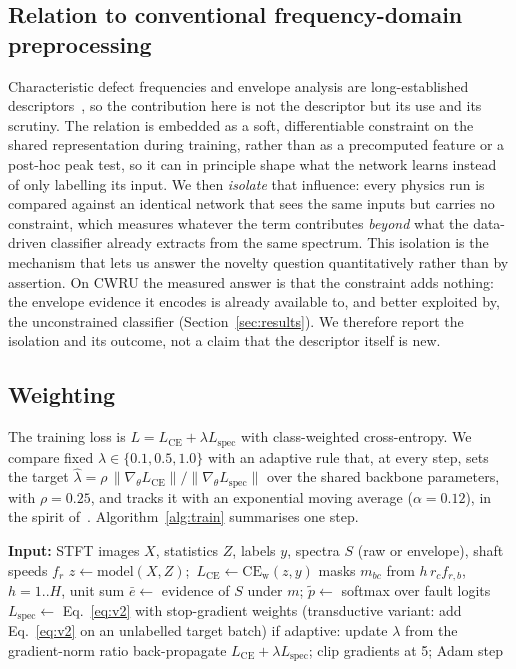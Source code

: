 \documentclass[conference]{IEEEtran}
\newcommand{\Lspec}{L_{\mathrm{spec}}}
\begin{document}
\subsection{Relation to conventional frequency-domain preprocessing}
\label{sec:novelty}
Characteristic defect frequencies and envelope analysis are long-established
descriptors~\cite{mcfadden1984,randall2011}, so the contribution here is not the
descriptor but its use and its scrutiny. The relation is embedded as a soft,
differentiable constraint on the shared representation during training, rather
than as a precomputed feature or a post-hoc peak test, so it can in principle
shape what the network learns instead of only labelling its input. We then
\emph{isolate} that influence: every physics run is compared against an
identical network that sees the same inputs but carries no constraint, which
measures whatever the term contributes \emph{beyond} what the data-driven
classifier already extracts from the same spectrum. This isolation is the
mechanism that lets us answer the novelty question quantitatively rather than by
assertion. On CWRU the measured answer is that the constraint adds nothing: the
envelope evidence it encodes is already available to, and better exploited by,
the unconstrained classifier (Section~\ref{sec:results}). We therefore report
the isolation and its outcome, not a claim that the descriptor itself is new.

\subsection{Weighting}
The training loss is $L=L_{\mathrm{CE}}+\lambda\Lspec$ with class-weighted
cross-entropy. We compare fixed $\lambda\in\{0.1,0.5,1.0\}$ with an adaptive
rule that, at every step, sets the target
$\hat\lambda=\rho\,\lVert\nabla_\theta L_{\mathrm{CE}}\rVert/\lVert\nabla_\theta\Lspec\rVert$
over the shared backbone parameters, with $\rho=0.25$, and tracks it with an
exponential moving average ($\alpha=0.12$), in the spirit
of~\cite{wang2021,mcclenny2023}. Algorithm~\ref{alg:train} summarises one step.

\begin{algorithm}[t]
\caption{Training step with the revised spectral prior}
\label{alg:train}
\begin{algorithmic}[1]
\STATE \textbf{Input:} STFT images $X$, statistics $Z$, labels $y$, spectra $S$ (raw or envelope), shaft speeds $f_r$
\STATE $z \leftarrow \mathrm{model}(X,Z)$;\ $L_{\mathrm{CE}}\leftarrow\mathrm{CE}_{\mathrm{w}}(z,y)$
\STATE masks $m_{bc}$ from $h\,r_c f_{r,b}$, $h=1..H$, unit sum
\STATE $\bar e\leftarrow$ evidence of $S$ under $m$; $\tilde p\leftarrow$ softmax over fault logits
\STATE $\Lspec\leftarrow$ Eq.~\eqref{eq:v2} with stop-gradient weights
\STATE (transductive variant: add Eq.~\eqref{eq:v2} on an unlabelled target batch)
\STATE if adaptive: update $\lambda$ from the gradient-norm ratio
\STATE back-propagate $L_{\mathrm{CE}}+\lambda\Lspec$; clip gradients at 5; Adam step
\end{algorithmic}
\end{algorithm}
\end{document}
